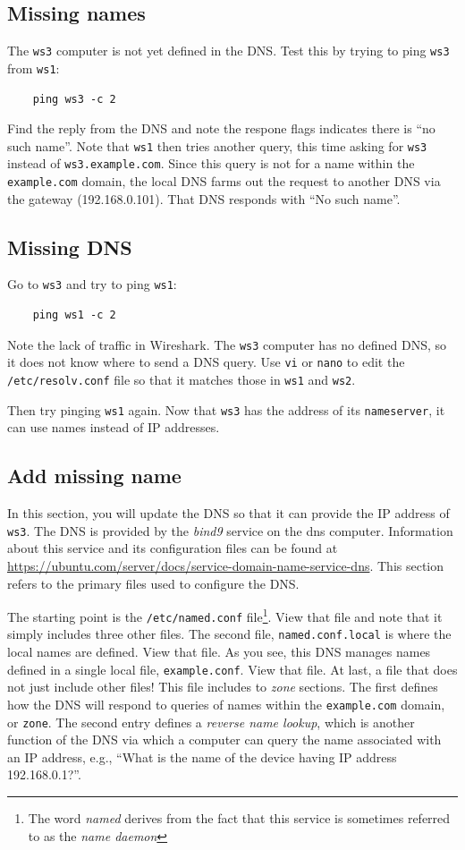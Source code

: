 \subsection{Missing names}
The {\tt ws3} computer is not yet defined in the DNS.  Test this by trying to ping {\tt ws3} from {\tt ws1}:
\begin{verbatim}
    ping ws3 -c 2
\end{verbatim}
Find the reply from the DNS and note the respone flags indicates there is ``no such name''.
Note that {\tt ws1} then tries another query, this time asking for {\tt ws3} instead of {\tt ws3.example.com}.
Since this query is not for a name within the {\tt example.com} domain, the local DNS farms out the request
to another DNS via the gateway (192.168.0.101).  That DNS responds with ``No such name''.

\subsection{Missing DNS}
Go to {\tt ws3} and try to ping {\tt ws1}:
\begin{verbatim}
    ping ws1 -c 2
\end{verbatim}
\noindent Note the lack of traffic in Wireshark.  The {\tt ws3} computer has no defined DNS, so it does not
know where to send a DNS query.  Use {\tt vi} or {\tt nano} to edit the {\tt /etc/resolv.conf} file so that
it matches those in {\tt ws1} and {\tt ws2}.

Then try pinging {\tt ws1} again.  Now that {\tt ws3} has the address of its {\tt nameserver}, it can use
names instead of IP addresses.

\subsection{Add missing name}
In this section, you will update the DNS so that it can provide the IP address of {\tt ws3}.
The DNS is provided by the \textit{bind9} service on the dns computer.  Information about this service and
its configuration files can be found at \url{https://ubuntu.com/server/docs/service-domain-name-service-dns}.
This section refers to the primary files used to configure the DNS.  

The starting point is the {\tt /etc/named.conf} file\footnote{The word \textit{named} derives from
the fact that this service is sometimes referred to as the \textit{name daemon}}.  View that file and note that it simply includes
three other files.  The second file, {\tt named.conf.local} is where the local names are defined.
View that file.  As you see, this DNS manages names defined in a single local file, {\tt example.conf}. 
View that file.  At last, a file that does not just include other files!  This file includes to \textit{zone}
sections.  The first defines how the DNS will respond to queries of names within the {\tt example.com}
domain, or {\tt zone}.  The second entry defines a \textit{reverse name lookup}, which is another function of
the DNS via which a computer can query the name associated with an IP address, e.g., ``What is the name of
the device having IP address 192.168.0.1?''.

